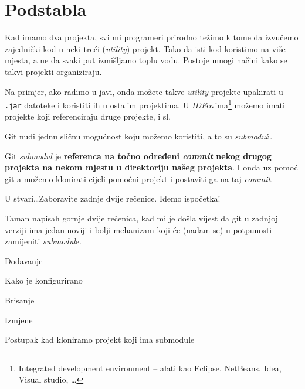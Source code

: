 \chapter*{Podstabla}

Kad imamo dva projekta, svi mi programeri prirodno težimo k tome da izvučemo zajednički kod u neki treći (\emph{utility}) projekt.
Tako da isti kod koristimo na više mjesta, a ne da svaki put izmišljamo toplu vodu.
Postoje mnogi načini kako se takvi projekti organiziraju.

Na primjer, ako radimo u javi, onda možete takve \emph{utility} projekte upakirati u \verb+.jar+ datoteke i koristiti ih u ostalim projektima.
U \emph{IDE}ovima\footnote{Integrated development environment -- alati kao Eclipse, NetBeans, Idea, Visual studio, \dots} možemo imati projekte koji referenciraju druge projekte, i sl.

Git nudi jednu sličnu mogućnost koju možemo koristiti, a to su \emph{submodul}i.

Git \emph{submodul} je \textbf{referenca na točno određeni \emph{commit} nekog drugog projekta na nekom mjestu u direktoriju našeg projekta}.
I onda uz pomoć git-a možemo klonirati cijeli pomoćni projekt i postaviti ga na taj \emph{commit}.

U stvari\dots Zaboravite zadnje dvije rečenice. Idemo ispočetka!

Taman napisah gornje dvije rečenica, kad mi je došla vijest da git u zadnjoj verziji ima jedan noviji i bolji mehanizam koji će (nadam se) u potpunosti zamijeniti \emph{submodul}e.

\TODO Dodavanje

\TODO Kako je konfigurirano

\TODO Brisanje

\TODO Izmjene

\TODO Postupak kad kloniramo projekt koji ima submodule


